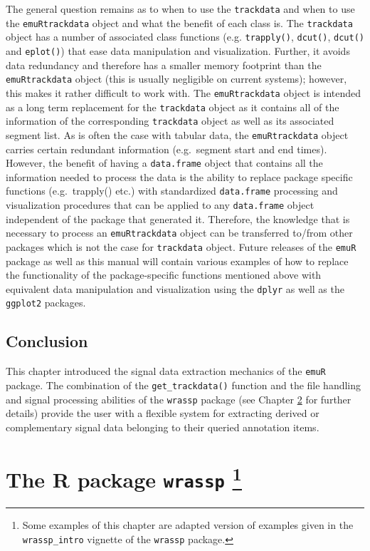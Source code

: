 \documentclass[]{book}
\let\rmarkdownfootnote\footnote%
\def\footnote{\protect\rmarkdownfootnote}
\theoremstyle{definition}
\theoremstyle{definition}
\theoremstyle{definition}
\theoremstyle{remark}
\begin{document}
The general question remains as to when to use the \texttt{trackdata}
and when to use the \texttt{emuRtrackdata} object and what the benefit
of each class is. The \texttt{trackdata} object has a number of
associated class functions (e.g. \texttt{trapply()}, \texttt{dcut()},
\texttt{dcut()} and \texttt{eplot()}) that ease data manipulation and
visualization. Further, it avoids data redundancy and therefore has a
smaller memory footprint than the \texttt{emuRtrackdata} object (this is
usually negligible on current systems); however, this makes it rather
difficult to work with. The \texttt{emuRtrackdata} object is intended as
a long term replacement for the \texttt{trackdata} object as it contains
all of the information of the corresponding \texttt{trackdata} object as
well as its associated segment list. As is often the case with tabular
data, the \texttt{emuRtrackdata} object carries certain redundant
information (e.g.~segment start and end times). However, the benefit of
having a \texttt{data.frame} object that contains all the information
needed to process the data is the ability to replace package specific
functions (e.g.~trapply() etc.) with standardized \texttt{data.frame}
processing and visualization procedures that can be applied to any
\texttt{data.frame} object independent of the package that generated it.
Therefore, the knowledge that is necessary to process an
\texttt{emuRtrackdata} object can be transferred to/from other packages
which is not the case for \texttt{trackdata} object. Future releases of
the \texttt{emuR} package as well as this manual will contain various
examples of how to replace the functionality of the package-specific
functions mentioned above with equivalent data manipulation and
visualization using the \texttt{dplyr} as well as the \texttt{ggplot2}
packages.

\hypertarget{conclusion-3}{%
\section{Conclusion}\label{conclusion-3}}

This chapter introduced the signal data extraction mechanics of the
\texttt{emuR} package. The combination of the \texttt{get\_trackdata()}
function and the file handling and signal processing abilities of the
\texttt{wrassp} package (see Chapter \ref{chap:wrassp} for further
details) provide the user with a flexible system for extracting derived
or complementary signal data belonging to their queried annotation
items.

\hypertarget{chap:wrassp}{%
\chapter[The R package \texttt{wrassp} ]{\texorpdfstring{The R package
\texttt{wrassp} \footnote{Some examples of this chapter are adapted
  version of examples given in the \texttt{wrassp\_intro} vignette of
  the \texttt{wrassp} package.}}{The R package wrassp }}\label{chap:wrassp}}
\end{document}

